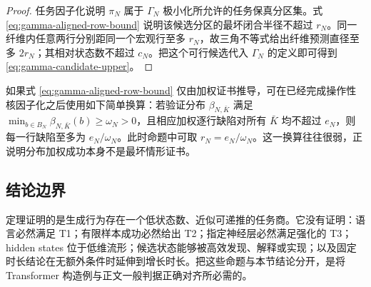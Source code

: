 \begin{proof}
任务因子化说明 $\pi_N$ 属于 $\Gamma_N$ 极小化所允许的任务保真分区集。式
\eqref{eq:gamma-aligned-row-bound} 说明该候选分区的最坏闭合半径不超过 $r_N$。同一纤维内任意两行分别距同一个宏观行至多 $r_N$，故三角不等式给出纤维预测直径至多 $2r_N$；其相对状态数不超过 $c_N$。把这个可行候选代入 $\Gamma_N$ 的定义即可得到
\eqref{eq:gamma-candidate-upper}。
\end{proof}

如果式 \eqref{eq:gamma-aligned-row-bound} 仅由加权证书推导，可在已经完成操作性核因子化之后使用如下简单换算：若验证分布
$\beta_{N,\bar K}$ 满足
$\min_{b\in B_N}\beta_{N,\bar K}(b)\ge\omega_N>0$，且相应加权逐行缺陷对所有 $\bar K$ 均不超过 $e_N$，则每一行缺陷至多为
$e_N/\omega_N$。此时命题中可取 $r_N=e_N/\omega_N$。这一换算往往很弱，正说明分布加权成功本身不是最坏情形证书。

\subsection{结论边界}

定理证明的是生成行为存在一个低状态数、近似可递推的任务商。它没有证明：语言必然满足 T1；有限样本成功必然给出 T2；指定神经层必然满足强化的 T3；hidden states 位于低维流形；候选状态能够被高效发现、解释或实现；以及固定时长结论在无额外条件时延伸到增长时长。把这些命题与本节结论分开，是将 Transformer 构造例与正文一般判据正确对齐所必需的。

